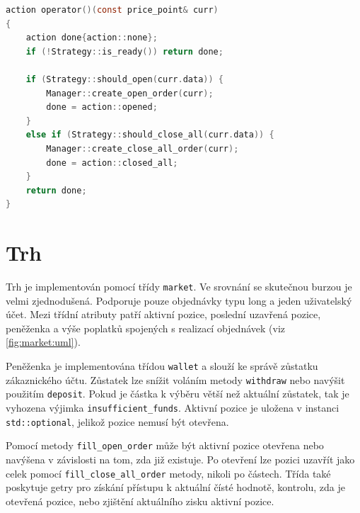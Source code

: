 \begin{lstlisting}[caption={~Implementace volacího operátoru třídy \texttt{bazooka::trader}},label={lst:trade},captionpos=t,abovecaptionskip=-\medskipamount,belowcaptionskip=\medskipamount,language=C]
action operator()(const price_point& curr)
{
    action done{action::none};
    if (!Strategy::is_ready()) return done;

    if (Strategy::should_open(curr.data)) {
        Manager::create_open_order(curr);
        done = action::opened;
    }
    else if (Strategy::should_close_all(curr.data)) {
        Manager::create_close_all_order(curr);
        done = action::closed_all;
    }
    return done;
}
\end{lstlisting}

\section{Trh}
Trh je implementován pomocí třídy \texttt{market}.
Ve srovnání se skutečnou burzou je velmi zjednodušená.
Podporuje pouze objednávky typu long a jeden uživatelský účet.
Mezi třídní atributy patří aktivní pozice, poslední uzavřená pozice, peněženka a výše poplatků spojených s realizací objednávek (viz \ref{fig:market:uml}).

Peněženka je implementována třídou \texttt{wallet} a slouží ke správě zůstatku zákaznického účtu.
Zůstatek lze snížit voláním metody \texttt{withdraw} nebo navýšit použitím \texttt{deposit}.
Pokud je částka k výběru větší než aktuální zůstatek, tak je vyhozena výjimka \texttt{insufficient\_funds}.
Aktivní pozice je uložena v instanci \texttt{std::optional}, jelikož pozice nemusí být otevřena.

Pomocí metody \texttt{fill\_open\_order} může být aktivní pozice otevřena nebo navýšena v závislosti na tom, zda již existuje.
Po otevření lze pozici uzavřít jako celek pomocí \texttt{fill\_close\_all\_order} metody, nikoli po částech.
Třída také poskytuje getry pro získání přístupu k aktuální čísté hodnotě, kontrolu, zda je otevřená pozice, nebo zjištění aktuálního zisku aktivní pozice.

